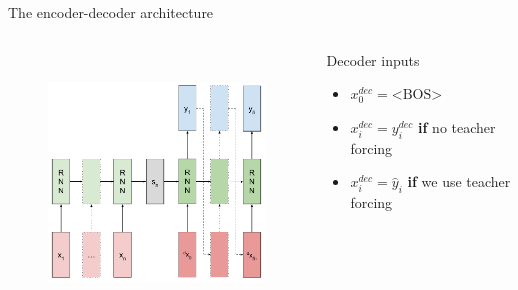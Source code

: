 \documentclass[12pt,aspectratio=169,handout]{beamer}
\begin{document}
\begin{frame}{The encoder-decoder architecture}

	\begin{columns}[T] %
		\begin{column}{.59\textwidth}
		
			\begin{figure}[h]
			\includegraphics[height=7cm]{sequence_to_sequence_anno.pdf}
		\end{figure}
		
		\end{column}
		\pause
		\begin{column}{.39\textwidth}
			\vspace{2cm}
			Decoder inputs
			\begin{itemize}
				\item $x_0^{dec} = \text{<BOS>}$
				\item $x_i^{dec} = y_{i}^{dec}$ \textbf{if} no teacher forcing
				\item $x_i^{dec} = \hat{y}_{i}$ \textbf{if} we use teacher forcing 
			\end{itemize}
		\end{column}
	\end{columns}

\end{frame}


\end{document}
